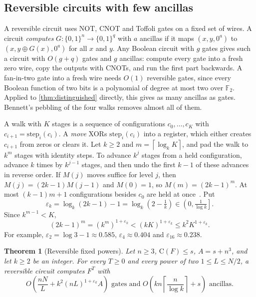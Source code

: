 \documentclass[11pt]{article}
\newtheorem{theorem}{Theorem}[section]
\theoremstyle{definition}
\theoremstyle{remark}
\newcommand{\bits}{\{0,1\}}
\newcommand{\CC}{\mathrm{C}}
\newcommand{\ceil}[1]{\left\lceil #1\right\rceil}
\numberwithin{equation}{section}
\begin{document}
\subsection{Reversible circuits with few ancillas}

A reversible circuit uses NOT, CNOT and Toffoli gates on a fixed set of
wires.  A circuit \emph{computes} $G:\bits^n\to\bits^q$ with $a$ ancillas
if it maps $(x,y,0^a)$ to $(x,y\oplus G(x),0^a)$ for all $x$ and $y$.
Any Boolean circuit with $g$ gates gives such a circuit with $O(g+q)$
gates and $g$ ancillas: compute every gate into a fresh zero wire, copy
the outputs with CNOTs, and run the first part backwards.
A fan-in-two gate into a fresh wire needs $O(1)$ reversible gates, since
every Boolean function of two bits is a polynomial of degree at most two
over $\mathbb F_2$.  Applied to \cref{thm:distinguished} directly, this
gives as many ancillas as gates.  Bennett's pebbling of the four walks
removes almost all of them.

A walk with $K$ stages is a sequence of configurations $c_0,\ldots,c_K$
with $c_{i+1}=\mathrm{step}_i(c_i)$.  A \emph{move} XORs
$\mathrm{step}_i(c_i)$ into a register, which either creates $c_{i+1}$
from zeros or clears it.  Let $k\geq2$ and $m=\ceil{\log_kK}$, and pad the
walk to $k^m$ stages with identity steps.  To advance $k^j$ stages from a
held configuration, advance $k$ times by $k^{j-1}$ stages, and then undo
the first $k-1$ of these advances in reverse order.  If $M(j)$ moves
suffice for level $j$, then $M(j)=(2k-1)M(j-1)$ and $M(0)=1$, so
$M(m)=(2k-1)^m$.  At most $(k-1)m+1$ configurations besides $c_0$ are
held at once~\cite{Bennett89,LS90}.  Put
\[
  \varepsilon_k=\log_k(2k-1)-1=\log_k\!\left(2-\tfrac1k\right)
  \in\left(0,\tfrac1{\log k}\right].
\]
Since $k^{m-1}<K$,
\[
  (2k-1)^m=(k^m)^{1+\varepsilon_k}<(kK)^{1+\varepsilon_k}\leq k^2K^{1+\varepsilon_k}.
\]
For example, $\varepsilon_2=\log3-1\approx0.585$, $\varepsilon_4\approx0.404$
and $\varepsilon_{16}\approx0.238$.

\begin{theorem}[Reversible fixed powers]\label{thm:reversible}
Let $n\geq3$, $\CC(F)\leq s$, $A=s+n^3$, and let $k\geq2$ be an integer.
For every $T\geq0$ and every power of two $1\leq L\leq N/2$, a reversible
circuit computes $F^T$ with
\[
  O\!\left(\frac{nN}{L}+k^2(nL)^{1+\varepsilon_k}A\right)
  \text{ gates and }
  O\!\left(kn\ceil{\frac{n}{\log k}}+s\right)\text{ ancillas.}
\]
\end{theorem}
\end{document}
